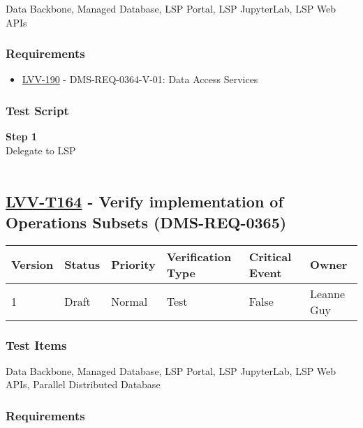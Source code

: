 Data Backbone, Managed Database, LSP Portal, LSP JupyterLab, LSP Web
APIs~

\hypertarget{requirements-140}{%
\subsubsection{Requirements}\label{requirements-140}}

\begin{itemize}
\tightlist
\item
  \href{https://jira.lsstcorp.org/browse/LVV-190}{LVV-190} -
  DMS-REQ-0364-V-01: Data Access Services
\end{itemize}

\hypertarget{test-script-140}{%
\subsubsection{Test Script}\label{test-script-140}}

\textbf{Step 1}\\
Delegate to LSP\\
~\\

\hypertarget{lvv-t164---verify-implementation-of-operations-subsets-dms-req-0365}{%
\subsection{\texorpdfstring{\href{https://jira.lsstcorp.org/secure/Tests.jspa\#/testCase/LVV-T164}{LVV-T164}
- Verify implementation of Operations Subsets
(DMS-REQ-0365)}{LVV-T164 - Verify implementation of Operations Subsets (DMS-REQ-0365)}}\label{lvv-t164---verify-implementation-of-operations-subsets-dms-req-0365}}

\begin{longtable}[]{@{}llllll@{}}
\toprule
Version & Status & Priority & Verification Type & Critical Event &
Owner\tabularnewline
\midrule
\endhead
1 & Draft & Normal & Test & False & Leanne Guy\tabularnewline
\bottomrule
\end{longtable}

\hypertarget{test-items-140}{%
\subsubsection{Test Items}\label{test-items-140}}

Data Backbone, Managed Database, LSP Portal, LSP JupyterLab, LSP Web
APIs, Parallel Distributed Database~

\hypertarget{requirements-141}{%
\subsubsection{Requirements}\label{requirements-141}}

